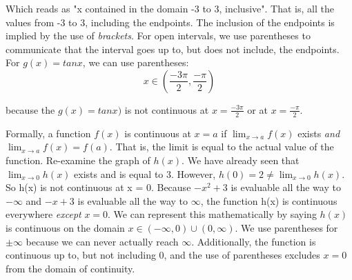 Which reads as "x contained in the domain -3 to 3, inclusive". That is, all the values from -3 to 3, including the endpoints. The inclusion of the endpoints is implied by the use of \textit{brackets}. For open intervals, we use parentheses to communicate that the interval goes up to, but does not include, the endpoints. For $g(x) = tanx$, we can use parentheses: $$x \in \left(\frac{-3\pi}{2}, \frac{-\pi}{2}\right)$$

because the $g(x) = tanx)$ is not continuous at $x=\frac{-3\pi}{2}$ or at $x=\frac{-\pi}{2}$.



Formally, a function $f(x)$ is continuous at $x=a$ if $\lim_{x\to a}f(x)$ exists \textit{and} $\lim_{x\to a}f(x) = f(a)$. That is, the limit is equal to the actual value of the function. Re-examine the graph of $h(x)$. We have already seen that $\lim_{x\to 0}h(x)$ exists and is equal to 3. However, $h(0) = 2 \neq \lim_{x\to0}h(x)$. So h(x) is not continuous at x = 0. Because $-x^2+3$ is evaluable all the way to $-\infty$ and $-x+3$ is evaluable all the way to $\infty$, the function h(x) is continuous everywhere \textit{except} $x=0$. We can represent this mathematically by saying $h(x)$ is continuous on the domain $x \in \left(-\infty, 0\right)\cup \left(0, \infty\right)$. We use parentheses for $\pm\infty$ because we can never actually reach $\infty$. Additionally, the function is continuous up to, but not including $0$, and the use of parentheses excludes $x=0$ from the domain of continuity.


